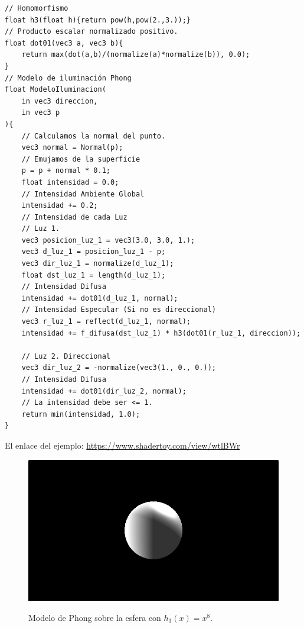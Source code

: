\begin{lstlisting}
// Homomorfismo
float h3(float h){return pow(h,pow(2.,3.));}
// Producto escalar normalizado positivo.
float dot01(vec3 a, vec3 b){ 
    return max(dot(a,b)/(normalize(a)*normalize(b)), 0.0);
}
// Modelo de iluminación Phong
float ModeloIluminacion(
    in vec3 direccion,
    in vec3 p
){
    // Calculamos la normal del punto.
    vec3 normal = Normal(p);
    // Emujamos de la superficie
    p = p + normal * 0.1;
    float intensidad = 0.0;
    // Intensidad Ambiente Global
    intensidad += 0.2;
    // Intensidad de cada Luz
    // Luz 1.
    vec3 posicion_luz_1 = vec3(3.0, 3.0, 1.);
    vec3 d_luz_1 = posicion_luz_1 - p;
    vec3 dir_luz_1 = normalize(d_luz_1);
    float dst_luz_1 = length(d_luz_1);
    // Intensidad Difusa
    intensidad += dot01(d_luz_1, normal);
    // Intensidad Especular (Si no es direccional)
    vec3 r_luz_1 = reflect(d_luz_1, normal);
    intensidad += f_difusa(dst_luz_1) * h3(dot01(r_luz_1, direccion));
    
    // Luz 2. Direccional
    vec3 dir_luz_2 = -normalize(vec3(1., 0., 0.));
    // Intensidad Difusa
    intensidad += dot01(dir_luz_2, normal);
    // La intensidad debe ser <= 1.
    return min(intensidad, 1.0);
}
\end{lstlisting}

El enlace del ejemplo: \url{https://www.shadertoy.com/view/wtlBWr}\\
\begin{figure}[H]
  \centering
  \captionsetup{justification=centering}%
  \includegraphics[width=1.0\textwidth]{secciones/imagenes/lightmodel/phong.png}\label{fig:phong}
  \caption{Modelo de Phong sobre la esfera con \(h_3(x)=x^8\).}
\end{figure}

